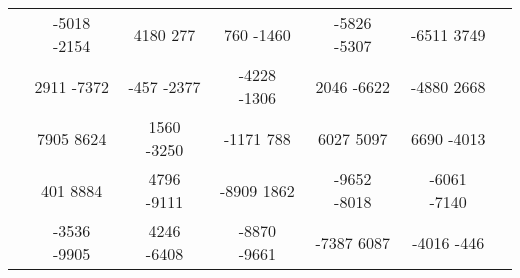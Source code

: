 \begin{landscape}
\begin{table}[]
\begin{tabular}{|c|ccccc|c|}
				 & -5018 -2154 & 4180 277 & 760 -1460 & -5826 -5307 & -6511 3749 & 		 \\
				 & 2911 -7372 & -457 -2377 & -4228 -1306 & 2046 -6622 & -4880 2668 & 		 \\
				 & 7905 8624 & 1560 -3250 & -1171 788 & 6027 5097 & 6690 -4013 & 		 \\
				 & 401 8884 & 4796 -9111 & -8909 1862 & -9652 -8018 & -6061 -7140 & 		 \\
				 & -3536 -9905 & 4246 -6408 & -8870 -9661 & -7387 6087 & -4016 -446 & 		 \\ \hline
		\end{tabular}
	\end{table}
\end {landscape}

\setcounter{tablepart}{1}
\setcounter{table}{0}
\renewcommand{\thetable}{A.\arabic{table}}
